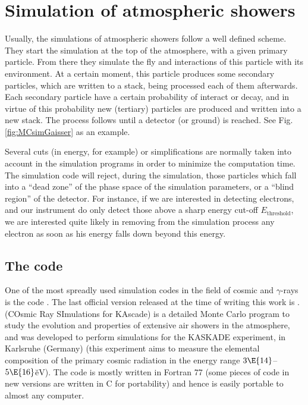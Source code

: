 
\chapter{Simulation of atmospheric showers}
\label{chapter:simshowers}
%
Usually, the \MC simulations of atmospheric showers follow a well
defined scheme. They start the simulation at the top of the
atmosphere, with a given primary particle. From there they simulate
the fly and interactions of this particle with its environment. At a
certain moment, this particle produces some secondary particles, which
are written to a stack, being processed each of them afterwards. Each
secondary particle have a certain probability of interact or decay,
and in virtue of this probability new (tertiary) particles are
produced and written into a new stack. The process follows until a
detector (or ground) is reached. See Fig. \ref{fig:MCsimGaisser} as an
example.

\mcsimsample

Several cuts (in energy, for example) or simplifications are normally
taken into account in the simulation programs in order to minimize the
computation time. The simulation code will reject, during the
simulation, those particles which fall into a ``dead zone'' of the
phase space of the simulation parameters, or a ``blind region'' of the
detector.  For instance, if we are interested in detecting electrons,
and our instrument do only detect those above a sharp energy cut-off
$E_{\mathrm{threshold}}$, we are interested quite likely in removing
from the simulation process any electron as soon as his energy falls
down beyond this energy.

\section{The \CORSIKA code}
\label{sec:CORSIKA}
%
One of the most spreadly used simulation codes in the field of cosmic
and $\gamma$-rays is the \CORSIKA code \cite{CORSIKA:manual}. The last
official version released at the time of writing this work is
\lastCORSIKA.  \CORSIKA (COsmic Ray SImulations for KAscade) is a
detailed Monte Carlo program to study the evolution and properties of
extensive air showers in the atmosphere, and was developed to perform
simulations for the KASKADE experiment, in Karlsruhe (Germany)
\cite{KASKADE} (this experiment aims to measure the elemental
composition of the primary cosmic radiation in the energy range
$3\E{14}$--$5\E{16}$\u{eV}). The code is mostly written in Fortran 77
(some pieces of code in new versions are written in C for portability)
and hence is easily portable to almost any computer.

